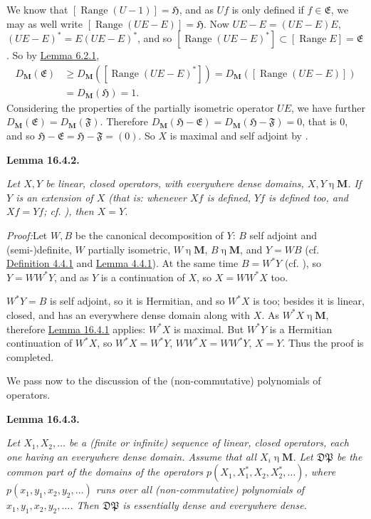 \documentclass[12pt,b5paper,twoside]{article}
\newcommand{\Hspace}{\mathfrak H}
\newcommand{\M}{\mathbf M}
\newcommand{\Lemma}[1]{%
  \par\smallskip\noindent\phantomsection\label{lem:#1}\textbf{Lemma #1.}\enspace
}
\newcommand{\Proof}{\par\noindent\textit{Proof:}\enspace}
\newcommand{\defref}[1]{\hyperref[def:#1]{Definition #1}}
\newcommand{\lemref}[1]{\hyperref[lem:#1]{Lemma #1}}
\begin{document}
We know that \([\operatorname{Range}(U-1)]=\Hspace\), and as \(Uf\) is only
defined if \(f\in\mathfrak E\), we may as well write
\([\operatorname{Range}(UE-E)]=\Hspace\). Now
\(UE-E=(UE-E)E\), \((UE-E)^*=E(UE-E)^*\), and so
\([\operatorname{Range}(UE-E)^*]\subset[\operatorname{Range}E]
=\mathfrak E\). So by \lemref{6.2.1},
\[
\begin{aligned}
D_{\M}(\mathfrak E)
 &\geq D_{\M}([\operatorname{Range}(UE-E)^*])
  =D_{\M}([\operatorname{Range}(UE-E)])\\
 &=D_{\M}(\Hspace)=1.
\end{aligned}
\]
Considering the properties of the partially isometric operator \(UE\), we
have further \(D_{\M}(\mathfrak E)=D_{\M}(\mathfrak F)\). Therefore
\(D_{\M}(\Hspace-\mathfrak E)=D_{\M}(\Hspace-\mathfrak F)=0\), that is
\(0\), and so \(\Hspace-\mathfrak E=\Hspace-\mathfrak F=(0)\). So \(X\)
is maximal and self adjoint by \cite[p.~88]{ref16}.

\Lemma{16.4.2}
{\itshape Let \(X,Y\) be linear, closed operators, with everywhere dense
domains, \(X,Y\mathbin\eta\M\). If \(Y\) is an extension of \(X\) (that is:
whenever \(Xf\) is defined, \(Yf\) is defined too, and \(Xf=Yf\); cf.
\cite[p.~70]{ref15}), then \(X=Y\).}

\Proof Let \(W,B\) be the canonical decomposition of \(Y\): \(B\) self
adjoint and (semi-)definite, \(W\) partially isometric,
\(W\mathbin\eta\M\), \(B\mathbin\eta\M\), and \(Y=WB\) (cf.
\defref{4.4.1} and \lemref{4.4.1}). At the same time \(B=W^*Y\) (cf.
\cite[p.~306]{ref21}), so \(Y=W W^*Y\), and as \(Y\) is a continuation of
\(X\), so \(X=W W^*X\) too.

\(W^*Y=B\) is self adjoint, so it is Hermitian, and so \(W^*X\) is too;
besides it is linear, closed, and has an everywhere dense domain along with
\(X\). As \(W^*X\mathbin\eta\M\), therefore \lemref{16.4.1} applies:
\(W^*X\) is maximal. But \(W^*Y\) is a Hermitian continuation of \(W^*X\),
so \(W^*X=W^*Y\), \(WW^*X=WW^*Y\), \(X=Y\). Thus the proof is completed.

We pass now to the discussion of the (non-commutative) polynomials of
operators.

\Lemma{16.4.3}
{\itshape Let \(X_1,X_2,\ldots\) be a (finite or infinite) sequence of
linear, closed operators, each one having an everywhere dense domain. Assume
that all \(X_i\mathbin\eta\M\). Let \(\mathfrak D\mathfrak P\) be the common
part of the domains of the operators
\(p(X_1,X_1^*,X_2,X_2^*,\ldots)\), where
\(p(x_1,y_1,x_2,y_2,\ldots)\) runs over all (non-commutative) polynomials of
\(x_1,y_1,x_2,y_2,\ldots\). Then \(\mathfrak D\mathfrak P\) is essentially
dense and everywhere dense.}
\end{document}
